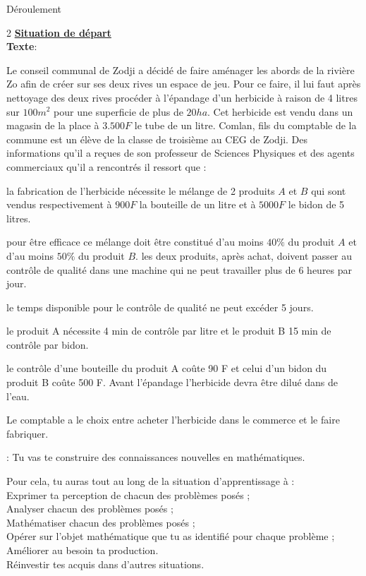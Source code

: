    \newpage
   \begin{center}
   	Déroulement
   \end{center}
  \begin{multicols*}{2}
  	\underline{\textbf{Situation de départ}} \\
  	\textbf{Texte}:	
  	
  	Le conseil communal de Zodji a décidé de faire aménager les abords de la rivière Zo afin de créer sur ses deux rives un espace de jeu. Pour ce faire, il lui faut après nettoyage des deux rives procéder à l’épandage d’un herbicide à raison de 4 litres sur $100 m^2$ pour une superficie de plus de $20 ha$. Cet herbicide est vendu dans un magasin de la place à $3.500 F$ le tube de un litre. Comlan, fils du comptable de la commune est un élève de la classe de troisième au CEG de Zodji. Des informations qu’il a reçues de son professeur de Sciences Physiques et des agents commerciaux qu’il a rencontrés il ressort que :
  	
  	 la fabrication de l’herbicide nécessite le mélange de 2 produits $A$ et $B$ qui sont vendus respectivement à $900F$ la bouteille de un litre et à $5000 F$ le bidon de 5 litres.
  	
  	 pour être efficace ce mélange doit être constitué d’au moins $40\%$ du produit $A$ et d’au moins $50 \%$ du produit $B$. les deux produits, après achat, doivent passer au contrôle de qualité dans une machine qui ne peut travailler plus de 6 heures par jour.
  	
  	 le temps disponible pour le contrôle de qualité ne peut excéder 5 jours. 
  	
  	 le produit A nécessite 4 min de contrôle par litre et le produit B 15 min de contrôle par bidon.
  	
  	 le contrôle d’une bouteille du produit A coûte 90 F et celui d’un bidon du produit B coûte 500 F. 
  	Avant l’épandage l’herbicide devra être dilué dans de l’eau. 
  	
  	Le comptable a le choix entre acheter l’herbicide dans le commerce et le faire fabriquer.
  	
  	 : Tu vas te construire des connaissances nouvelles en mathématiques.
  	
  	Pour cela, tu auras tout au long de la situation d’apprentissage à :\\ 
  	 Exprimer ta perception de chacun des problèmes posés ;\\ 
  	 Analyser chacun des problèmes posés ; \\
  	 Mathématiser chacun des problèmes posés ; \\
  	 Opérer sur l’objet mathématique que tu as identifié pour chaque problème ; \\
  	 Améliorer au besoin ta production.\\
  	 Réinvestir tes acquis dans d’autres situations.
  	

\end{multicols*}
